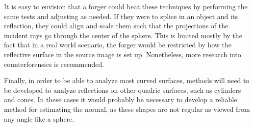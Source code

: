 \documentclass{thesis}
\begin{document}
It is easy to envision that a forger could beat these techniques by performing the same tests and adjusting as needed. If they were to splice in an object and its reflection, they could align and scale them such that the projections of the incident rays go through the center of the sphere. This is limited mostly by the fact that in a real world scenario, the forger would be restricted by how the reflective surface in the source image is set up. Nonetheless, more research into counterforensics is recommended.

Finally, in order to be able to analyze most curved surfaces, methods will need to be developed to analyze reflections on other quadric surfaces, such as cylinders and cones. In these cases it would probably be necessary to develop a reliable method for estimating the normal, as these shapes are not regular as viewed from any angle like a sphere.


\clearpage


\end{document}
